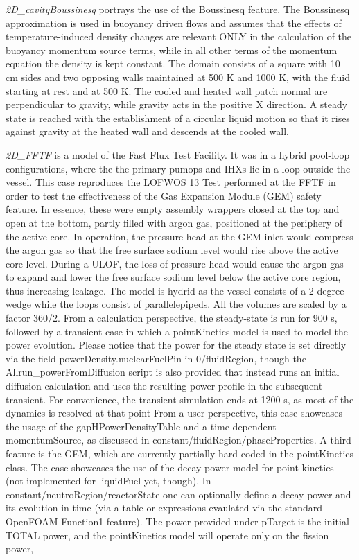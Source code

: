 \begin{DoxyItemize}
\item {\itshape 2\+D\+\_\+cavity\+Boussinesq} portrays the use of the Boussinesq feature. The Boussinesq approximation is used in buoyancy driven flows and assumes that the effects of temperature-\/induced density changes are relevant O\+N\+LY in the calculation of the buoyancy momentum source terms, while in all other terms of the momentum equation the density is kept constant. The domain consists of a square with 10 cm sides and two opposing walls maintained at 500 K and 1000 K, with the fluid starting at rest and at 500 K. The cooled and heated wall patch normal are perpendicular to gravity, while gravity acts in the positive X direction. A steady state is reached with the establishment of a circular liquid motion so that it rises against gravity at the heated wall and descends at the cooled wall.
\item {\itshape 2\+D\+\_\+\+F\+F\+TF} is a model of the Fast Flux Test Facility. It was in a hybrid pool-\/loop configurations, where the the primary pumops and I\+H\+Xs lie in a loop outside the vessel. This case reproduces the L\+O\+F\+W\+OS 13 Test performed at the F\+F\+TF in order to test the effectiveness of the Gas Expansion Module (G\+EM) safety feature. In essence, these were empty assembly wrappers closed at the top and open at the bottom, partly filled with argon gas, positioned at the periphery of the active core. In operation, the pressure head at the G\+EM inlet would compress the argon gas so that the free surface sodium level would rise above the active core level. During a U\+L\+OF, the loss of pressure head would cause the argon gas to expand and lower the free surface sodium level below the active core region, thus increasing leakage. The model is hydrid as the vessel consists of a 2-\/degree wedge while the loops consist of parallelepipeds. All the volumes are scaled by a factor 360/2. From a calculation perspective, the steady-\/state is run for 900 s, followed by a transient case in which a point\+Kinetics model is used to model the power evolution. Please notice that the power for the steady state is set directly via the field power\+Density.\+nuclear\+Fuel\+Pin in 0/fluid\+Region, though the Allrun\+\_\+power\+From\+Diffusion script is also provided that instead runs an initial diffusion calculation and uses the resulting power profile in the subsequent transient. For convenience, the transient simulation ends at 1200 s, as most of the dynamics is resolved at that point From a user perspective, this case showcases the usage of the gap\+H\+Power\+Density\+Table and a time-\/dependent momentum\+Source, as discussed in constant/fluid\+Region/phase\+Properties. A third feature is the G\+EM, which are currently partially hard coded in the point\+Kinetics class. The case showcases the use of the decay power model for point kinetics (not implemented for liquid\+Fuel yet, though). In constant/neutro\+Region/reactor\+State one can optionally define a decay power and its evolution in time (via a table or expressions evaulated via the standard Open\+F\+O\+AM Function1 feature). The power provided under p\+Target is the initial T\+O\+T\+AL power, and the point\+Kinetics model will operate only on the fission power, 
\end{DoxyItemize}
